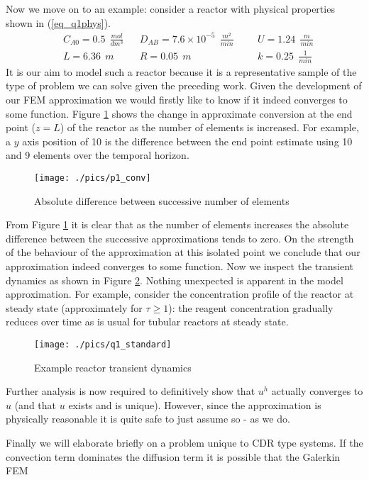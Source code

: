 \documentclass[11pt,fleqn]{article}
\theoremstyle{defstyle}
\begin{document}
Now we move on to an example: consider a reactor with physical properties shown in (\ref{eq_q1phys}).
\begin{equation}
\begin{aligned}
&C_{A0} = 0.5~~ \frac{mol}{dm^3}
&&D_{AB} = 7.6\times 10^{-5} ~~\frac{m^2}{min}
&&&U = 1.24~~ \frac{m}{min} \\
&L = 6.36~~ m 
&&R = 0.05~~ m
&&&k = 0.25~~ \frac{1}{min} 
\end{aligned}
\label{eq_q1phys}
\end{equation}
It is our aim to model such a reactor because it is a representative sample of the type of problem we can solve given the preceding work. Given the development of our FEM approximation we would firstly like to know if it indeed converges to some function. Figure \ref{fig_p1conv} shows the change in approximate conversion at the end point ($z=L$) of the reactor as the number of elements is increased. For example, a $y$ axis position of 10 is the difference between the end point estimate using 10 and 9 elements over the temporal horizon.
\begin{figure}[H] 
\centering
\texttt{[image: ./pics/p1\_conv]}
\caption{Absolute difference between successive number of elements} 
\label{fig_p1conv}
\end{figure}
From Figure \ref{fig_p1conv} it is clear that as the number of elements increases the absolute difference between the successive approximations tends to zero. On the strength of the behaviour of the approximation at this isolated point we conclude that our approximation indeed converges to some function. Now we inspect the transient dynamics as shown in Figure \ref{fig_q1std}. Nothing unexpected is apparent in the model approximation. For example, consider the concentration profile of the reactor at steady state (approximately for $\tau \geq 1$): the reagent concentration gradually reduces over time as is usual for tubular reactors at steady state.
\begin{figure}[H] 
\centering
\texttt{[image: ./pics/q1\_standard]}
\caption{Example reactor transient dynamics} 
\label{fig_q1std}
\end{figure}
Further analysis is now required to definitively show that $u^h$ actually converges to $u$ (and that $u$ exists and is unique). However, since the approximation is physically reasonable it is quite safe to just assume so - as we do.

Finally we will elaborate briefly on a problem unique to CDR type systems. If the convection term dominates the diffusion term it is possible that the Galerkin FEM
\end{document}
